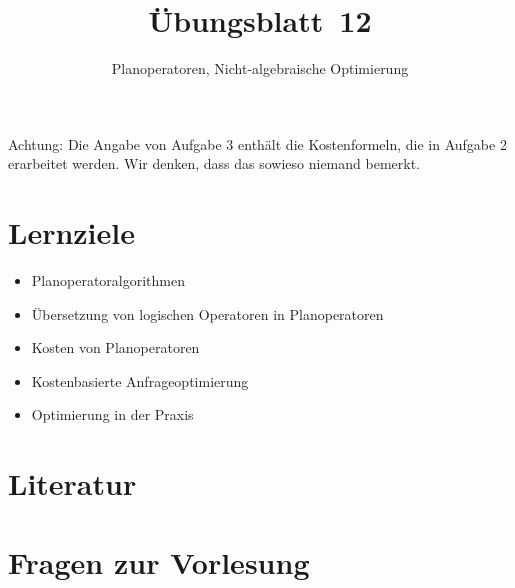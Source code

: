 \usetikzlibrary{arrows, calc}

\title{Übungsblatt~12}
\subtitle{Planoperatoren, Nicht-algebraische Optimierung}
\maketitle

\begin{note}
	Achtung: Die Angabe von Aufgabe 3 enthält die Kostenformeln, die in Aufgabe 2 erarbeitet werden.
	Wir denken, dass das sowieso niemand bemerkt.
\end{note}

\section*{Lernziele}
\begin{itemize}
	\item Planoperatoralgorithmen
	\item Übersetzung von logischen Operatoren in Planoperatoren
	\item Kosten von Planoperatoren
	\item Kostenbasierte Anfrageoptimierung
	\item Optimierung in der Praxis
\end{itemize}

\section*{Literatur}



\section{Fragen zur Vorlesung}
\begin{enumerate}[a)]


\end{enumerate}





\begin{deeper}

\end{deeper}


